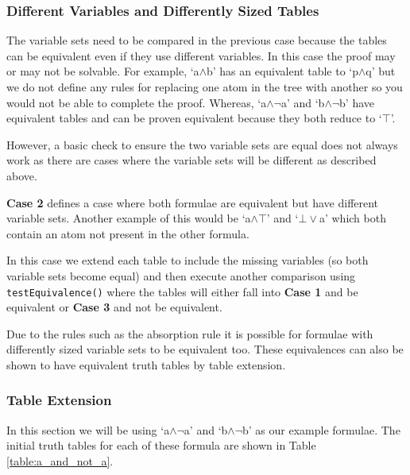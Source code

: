 \documentclass{report}
\begin{document}
\subsubsection{Different Variables and Differently Sized Tables}

The variable sets need to be compared in the previous case because the tables can be equivalent even if they use different variables. In this case the proof may or may not be solvable. For example, `a$\land$b' has an equivalent table to `p$\land$q' but we do not define any rules for replacing one atom in the tree with another so you would not be able to complete the proof. Whereas, `a$\land\lnot$a' and `b$\land\lnot$b' have equivalent tables and can be proven equivalent because they both reduce to `$\top$'.

However, a basic check to ensure the two variable sets are equal does not always work as there are cases where the variable sets will be different as described above. 

\textbf{Case 2} defines a case where both formulae are equivalent but have different variable sets. Another example of this would be `a$\land\top$' and `$\bot\lor$a' which both contain an atom not present in the other formula.

In this case we extend each table to include the missing variables (so both variable sets become equal) and then execute another comparison using {\tt testEquivalence()} where the tables will either fall into \textbf{Case 1} and be equivalent or \textbf{Case 3} and not be equivalent. 

Due to the rules such as the absorption rule it is possible for formulae with differently sized variable sets to be equivalent too. These equivalences can also be shown to have equivalent truth tables by table extension.

\subsubsection{Table Extension}

In this section we will be using `a$\land\lnot$a' and `b$\land\lnot$b' as our example formulae. The initial truth tables for each of these formula are shown in Table \ref{table:a_and_not_a}.
\end{document}
